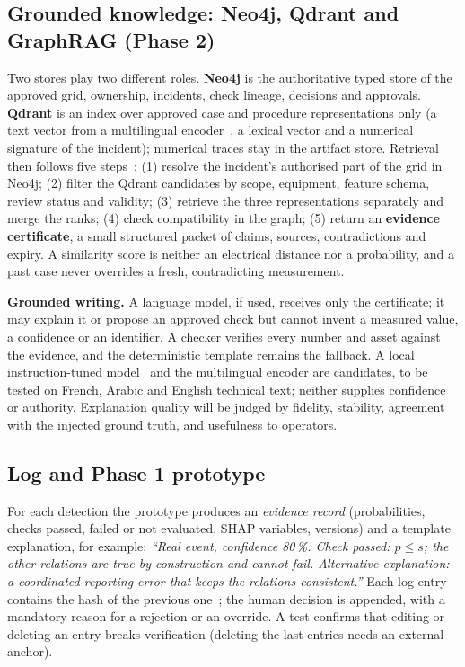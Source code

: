 \subsection{Grounded knowledge: Neo4j, Qdrant and GraphRAG (Phase 2)}
Two stores play two different roles. \textbf{Neo4j} is the authoritative typed store of the approved grid, ownership, incidents, check lineage, decisions and approvals. \textbf{Qdrant} is an index over approved case and procedure representations only (a text vector from a multilingual encoder~\cite{e5}, a lexical vector and a numerical signature of the incident); numerical traces stay in the artifact store. Retrieval then follows five steps~\cite{neo4jrag,qdrant}: (1) resolve the incident's authorised part of the grid in Neo4j; (2) filter the Qdrant candidates by scope, equipment, feature schema, review status and validity; (3) retrieve the three representations separately and merge the ranks; (4) check compatibility in the graph; (5) return an \textbf{evidence certificate}, a small structured packet of claims, sources, contradictions and expiry. A similarity score is neither an electrical distance nor a probability, and a past case never overrides a fresh, contradicting measurement.

\textbf{Grounded writing.} A language model, if used, receives only the certificate; it may explain it or propose an approved check but cannot invent a measured value, a confidence or an identifier. A checker verifies every number and asset against the evidence, and the deterministic template remains the fallback. A local instruction-tuned model~\cite{qwen} and the multilingual encoder are candidates, to be tested on French, Arabic and English technical text; neither supplies confidence or authority. Explanation quality will be judged by fidelity, stability, agreement with the injected ground truth, and usefulness to operators.

\subsection{Log and Phase 1 prototype}
For each detection the prototype produces an \emph{evidence record} (probabilities, checks passed, failed or not evaluated, SHAP variables, versions) and a template explanation, for example: \emph{``Real event, confidence 80\,\%. Check passed: $p\le s$; the other relations are true by construction and cannot fail. Alternative explanation: a coordinated reporting error that keeps the relations consistent.''} Each log entry contains the hash of the previous one~\cite{crosby}; the human decision is appended, with a mandatory reason for a rejection or an override. A test confirms that editing or deleting an entry breaks verification (deleting the last entries needs an external anchor).
